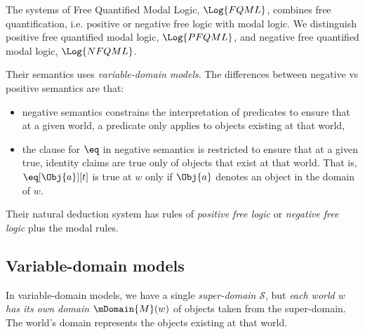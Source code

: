 \documentclass[../../../../include/open-logic-section]{subfiles}
\begin{document}


The systems of Free Quantified Modal Logic, $\Log{FQML}$,
combines free quantification, i.e. positive or negative 
free logic with modal logic. We distinguish 
positive free quantified modal logic, $\Log{PFQML}$,
and negative free quantified modal logic, $\Log{NFQML}$.

Their semantics uses \emph{variable-domain models}.
The differences between negative vs positive semantics
are that:
\begin{itemize}
\item negative semantics constrains the interpretation 
 of predicates to ensure that at a given world, a predicate 
 only applies to objects existing at that world,
 \item the clause for $\eq$ in negative semantics is restricted
 to ensure that at a given true, identity claims are true 
 only of objects that exist at that world. That is, $\eq[\Obj{a}][t]$
 is true at $w$ only if $\Obj{a}$ denotes an object in the domain of $w$. 
\end{itemize}

Their natural deduction system has rules of
\emph{positive free logic} or \emph{negative free logic}
plus the modal rules.

\subsection{Variable-domain models}

In variable-domain models, we have a single \emph{super-domain}
$\mathcal{S}$, but \emph{each world $w$ has its own domain}
$\mDomain{M}(w)$ of objects taken from the super-domain. The world's
domain represents the objects existing at that world.
\end{document}
